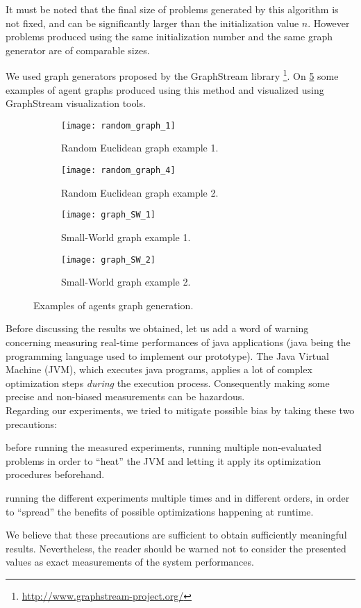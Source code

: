It must be noted that the final size of problems generated by this algorithm is not fixed, and can be significantly larger than the initialization value $n$. However problems produced using the same initialization number and the same graph generator are of comparable sizes.

We used graph generators proposed by the GraphStream library \footnote{\url{http://www.graphstream-project.org/}}. On \figurename{} \ref{graph_generation_examples} some examples of agent graphs produced using this method and visualized using GraphStream visualization tools.
 
\begin{figure}
\centering
	\begin{subfigure}[b]{0.45\textwidth}
		\texttt{[image: random\_graph\_1]}
		\caption{Random Euclidean graph example 1.}\label{generatedgraphs:rand1}
	\end{subfigure}
	\begin{subfigure}[b]{0.45\textwidth}
			\texttt{[image: random\_graph\_4]}
		\caption{Random Euclidean graph example 2.}\label{generatedgraphs:rand2}
	\end{subfigure}
	
	\begin{subfigure}[b]{0.45\textwidth}
		\texttt{[image: graph\_SW\_1]}
		\caption{Small-World graph example 1.}\label{generatedgraphs:sw1}
	\end{subfigure}
	\begin{subfigure}[b]{0.45\textwidth}
			\texttt{[image: graph\_SW\_2]}
		\caption{Small-World graph example 2.}\label{generatedgraphs:sw2}
	\end{subfigure}

\caption{Examples of agents graph generation.}
\label{graph_generation_examples}
\end{figure}

Before discussing the results we obtained, let us add a word of warning concerning measuring real-time performances of java applications (java being the programming language used to implement our prototype). The Java Virtual Machine (JVM), which executes java programs, applies a lot of complex optimization steps \emph{during} the execution process. Consequently making some precise and non-biased measurements can be hazardous.\\
Regarding our experiments, we tried to mitigate possible bias by taking these two precautions:
\begin{compactitem}
\item before running the measured experiments, running multiple non-evaluated problems in order to \enquote{heat} the JVM and letting it apply its optimization procedures beforehand.
\item running the different experiments multiple times and in different orders, in order to \enquote{spread} the benefits of possible optimizations happening at runtime.
\end{compactitem}
We believe that these precautions are sufficient to obtain sufficiently meaningful results. Nevertheless, the reader should be warned not to consider the presented values as exact measurements of the system performances.


